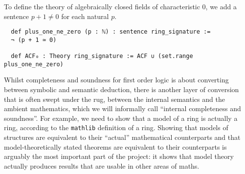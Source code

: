 \begin{dfn}
  To define the theory of algebraically closed fields of characteristic $0$,
  we add a sentence $p + 1 \ne 0$ for each natural $p$.

  \begin{lstlisting}
  def plus_one_ne_zero (p : ℕ) : sentence ring_signature :=
  ¬ (p + 1 ≃ 0)

  def ACF₀ : Theory ring_signature := ACF ∪ (set.range plus_one_ne_zero)  \end{lstlisting}

\end{dfn}

  Whilst completeness and soundness for first order logic
  is about converting between symbolic and semantic deduction,
  there is another layer of conversion that is often swept under the rug,
  between the internal semantics and the ambient mathematics,
  which we will informally call ``internal completeness and soundness''.
  For example, we need to show that a model of a ring is
  actually a ring, according to the \texttt{mathlib} definition of a ring.
  Showing that models of structures are equivalent to their ``actual'' mathematical counterparts
  and that model-theoretically stated theorems are equivalent to
  their counterparts is arguably the most important part of the project:
  it shows that model theory actually produces results that are usable
  in other areas of maths.




